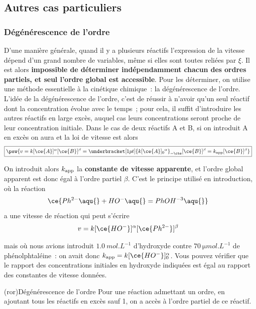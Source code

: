 \documentclass[../../main/main.tex]{subfiles}
\begin{document}
\subsection{Autres cas particuliers}
\subsubsection{Dégénérescence de l'ordre}
D'une manière générale, quand il y a plusieurs réactifs l'expression de la
vitesse dépend d'un grand nombre de variables, même si elles sont toutes reliées
par $\xi$. Il est alors \textbf{impossible de déterminer indépendamment chacun
	des ordres partiels, et seul l'ordre global est accessible}. Pour les
déterminer, on utilise une méthode essentielle à la cinétique chimique~: la
dégénérescence de l'ordre.
\bigbreak
L'idée de la dégénérescence de l'ordre, c'est de réussir à n'avoir qu'un seul
réactif dont la concentration évolue avec le temps~; pour cela, il suffit
d'introduire les autres réactifs en large excès, auquel cas leurs concentrations
seront proche de leur concentration initiale. Dans le cas de deux réactifs A et
B, si on introduit A en excès on aura
\psw{
	\[[\ce{A}](t) \approx [\ce{A}]_0\]
}
et la loi de vitesse est alors
\[
	\boxed{
	\psw{
	v =
	k[\ce{A}]^{\alpha}[\ce{B}]^{\beta} =
	\underbracket[1pt]{k[\ce{A}]_0{}^{\alpha}}_{= \cte}[\ce{B}]^{\beta} =
	k_{\rm app}[\ce{B}]^{\beta}
	}
	}
\]

On introduit alors $k_{\rm app}$ la \textbf{constante de vitesse apparente}, et
l'ordre global apparent est donc égal à l'ordre partiel $\beta$. C'est le
principe utilisé en introduction, où la réaction
\[\ce{Ph^{2-}\aqu{} + HO^{-}\aqu{} = PhOH^{-3}\aqu{}}\]
a une vitesse de réaction qui peut s'écrire
\[v = k[\ce{HO^{-}}]^{\alpha}[\ce{Ph^{2-}}]^{\beta}\]

mais où nous avions introduit $\SI{1.0}{mol.L^{-1}}$ d'hydroxyde contre
$\SI{70}{\micro mol.L^{-1}}$ de phénolphtaléine~: on avait donc $k_{\rm app} =
	k[\ce{HO^{-}}]_0^{\alpha}$. Vous pouvez vérifier que le rapport des
concentrations initiales en hydroxyde indiquées est égal au rapport des
constantes de vitesse données.

\begin{tcb}[label=prop:dege, bld, cnt](ror){Dégénérescence de l'ordre}
	Pour une réaction admettant un ordre, en ajoutant tous les réactifs en excès
	sauf 1, on a accès à l'ordre partiel de ce réactif.
\end{tcb}
\end{document}
